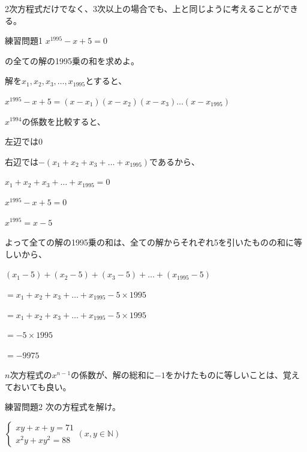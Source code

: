 \documentclass[uplatex,fleqn]{jsbook}
\begin{document}
2次方程式だけでなく、3次以上の場合でも、上と同じように考えることができる。

\begin{problem}{練習問題1}
    $x^{1995}-x+5=0$

    の全ての解の1995乗の和を求めよ。
\end{problem}

\begin{answer}
    解を$x_1,x_2,x_3,\dots,x_{1995}$とすると、

    $x^{1995}-x+5=\left(x-x_1\right)\left(x-x_2\right)\left(x-x_3\right)\dots \left(x-x_{1995}\right)$

    $x^{1994}$の係数を比較すると、

    左辺では$0$

    右辺では$-\left(x_1+x_2+x_3+\dots +x_{1995}\right)$であるから、

    $x_1+x_2+x_3+\dots +x_{1995}=0$

    $x^{1995}-x+5=0$

    $x^{1995}=x-5$

    よって全ての解の1995乗の和は、全ての解からそれぞれ5を引いたものの和に等しいから、

    $\left(x_1-5\right)+\left(x_2-5\right)+\left(x_3-5\right)+\dots +\left(x_{1995}-5\right)$

    $=x_1+x_2+x_3+\dots +x_{1995}-5\times 1995$

    $=x_1+x_2+x_3+\dots +x_{1995}-5\times 1995$

    $=-5\times 1995$

    $=-9975$
\end{answer}
$n$次方程式の$x^{n-1}$の係数が、解の総和に$-1$をかけたものに等しいことは、覚えておいても良い。

\begin{problem}{練習問題2}
    次の方程式を解け。

    \begin{math}
        \begin{cases}
            xy+x+y=71\\
            x^2y+xy^2=88
        \end{cases}
        \left(x,y\in\mathbb{N}\right)
    \end{math}
\end{problem}
\end{document}
